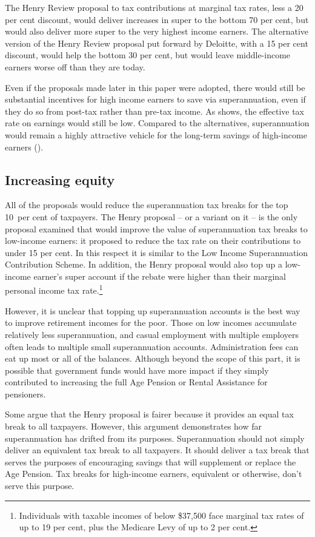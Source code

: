 The Henry Review proposal to tax contributions at marginal tax rates, less a 20 per cent discount, would deliver increases in super to the bottom 70 per cent, but would also deliver more super to the very highest income earners. The alternative version of the Henry Review proposal put forward by Deloitte, with a 15 per cent discount, would help the bottom 30 per cent, but would leave middle-income earners worse off than they are today. 

Even if the proposals made later in this paper were adopted, there would still be substantial incentives for high income earners to save via superannuation, even if they do so from post-tax rather than pre-tax income. As  shows, the effective tax rate on earnings would still be low. Compared to the alternatives, superannuation would remain a highly attractive vehicle for the long-term savings of high-income earners ().

\subsection{Increasing equity}
All of the proposals would reduce the superannuation tax breaks for the top 10~per cent of taxpayers. The Henry proposal – or a variant on it – is the only proposal examined that would improve the value of superannuation tax breaks to low-income earners: it proposed to reduce the tax rate on their contributions to under 15 per cent. In this respect it is similar to the Low Income Superannuation Contribution Scheme. In addition, the Henry proposal would also top up a low-income earner’s super account if the rebate were higher than their marginal personal income tax rate.\footnote{Individuals with taxable incomes of below \$37,500 face marginal tax rates of up to 19 per cent, plus the Medicare Levy of up to 2 per cent.} 

However, it is unclear that topping up superannuation accounts is the best way to improve retirement incomes for the poor. Those on low incomes accumulate relatively less superannuation, and casual employment with multiple employers often leads to multiple small superannuation accounts. Administration fees can eat up most or all of the balances. Although beyond the scope of this part, it is possible that government funds would have more impact if they simply contributed to increasing the full Age Pension or Rental Assistance for pensioners.

Some argue that the Henry proposal is fairer because it provides an equal tax break to all taxpayers. However, this argument demonstrates how far superannuation has drifted from its purposes. Superannuation should not simply deliver an equivalent tax break to all taxpayers. It should deliver a tax break that serves the purposes of encouraging savings that will supplement or replace the Age Pension. Tax breaks for high-income earners, equivalent or otherwise, don’t serve this purpose.

